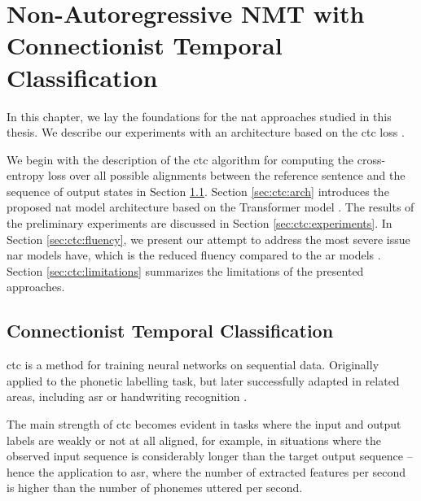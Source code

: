 \chapter{Non-Autoregressive NMT with Connectionist Temporal Classification}
\label{chap:nar-nmt-ctc}


\noindent
In this chapter, we lay the foundations for the \ac{nat} approaches studied in
this thesis. We describe our experiments with an architecture based on the
\ac{ctc} loss \citep{libovicky-helcl-2018-end}.

We begin with the description of the \ac{ctc} algorithm for computing the
cross-entropy loss over all possible alignments between the reference sentence
and the sequence of output states in Section \ref{sec:ctc}. Section
\ref{sec:ctc:arch} introduces the proposed \ac{nat} model architecture based on
the Transformer model \citep{vaswani2017attention}. The results of the
preliminary experiments are discussed in Section \ref{sec:ctc:experiments}. In
Section \ref{sec:ctc:fluency}, we present our attempt to address the most
severe issue \ac{nar} models have, which is the reduced fluency compared to the
\ac{ar} models \citep{kasner2020improving, kasner2020incorporating}. Section
\ref{sec:ctc:limitations} summarizes the limitations of the presented
approaches.

\section{Connectionist Temporal Classification}
\label{sec:ctc}

\Ac{ctc} \citep{graves2006connectionist} is a method for training neural
networks on sequential data. Originally applied to the phonetic labelling task,
but later successfully adapted in related areas, including \ac{asr} or
handwriting recognition \citep{liwicki2007novel, eyben2009speech,
  graves2014towards}.

The main strength of \ac{ctc} becomes evident in tasks where the input and
output labels are weakly or not at all aligned, for example, in situations
where the observed input sequence is considerably longer than the target output
sequence -- hence the application to \ac{asr}, where the number of extracted
features per second is higher than the number of phonemes uttered per second.

